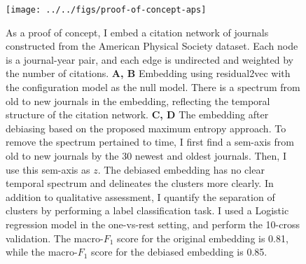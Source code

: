 \documentclass[12pt]{article} %
\begin{document}
\begin{figure}[h]
\begin{center}
\texttt{[image: ../../figs/proof-of-concept-aps]}
\end{center}
\caption{
    As a proof of concept, I embed a citation network of journals constructed from the American Physical Society dataset.
    Each node is a journal-year pair, and each edge is undirected and weighted by the number of citations.
    {\bf A, B} Embedding using residual2vec with the configuration model as the null model. There is a spectrum from old to new journals in the embedding, reflecting the temporal structure of the citation network.
    {\bf C, D} The embedding after debiasing based on the proposed maximum entropy approach. To remove the spectrum pertained to time, I first find a sem-axis from old to new journals by the 30 newest and oldest journals. Then, I use this sem-axis as $z$. The debiased embedding has no clear temporal spectrum and delineates the clusters more clearly.
    In addition to qualitative assessment, I quantify the separation of clusters by performing a label classification task. I used a Logistic regression model in the one-vs-rest setting, and perform the 10-cross validation. The macro-$F_1$ score for the original embedding is 0.81, while the macro-$F_1$ score for the debiased embedding is 0.85.
}
\label{fig:residual2vec_example}
\end{figure}





\printbibliography{}
\end{document}
